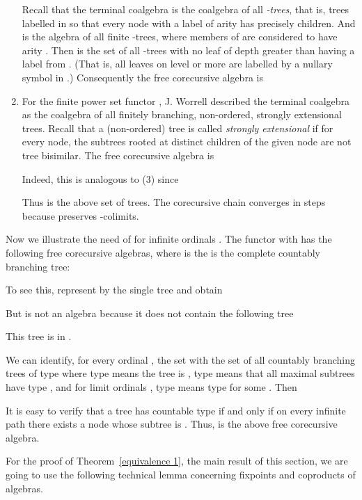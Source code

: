 \documentclass{LMCS}
\theoremstyle{plain}
\theoremstyle{definition}
\numberwithin{equation}{section}
\begin{document}
\begin{defi}
\begin{exa}
\begin{enumerate}
Recall that the terminal coalgebra is the coalgebra of all {\it -trees}, that is, trees labelled in  so that every node with a label of arity  has precisely  children. And  is the algebra of all finite -trees, where members of  are considered to have arity . Then  is the set of all -trees with no leaf of depth greater than  having a label from . (That is, all leaves on level  or more are labelled by a nullary symbol in .) Consequently the free corecursive algebra  is


\item For the finite power set functor , J. Worrell
\cite{w} described the terminal coalgebra  as the coalgebra of all finitely branching,
non-ordered, strongly extensional  trees. Recall that a (non-ordered)
tree is called {\it strongly extensional} if for every node, the subtrees rooted at distinct children of the given node are not tree bisimilar. The free corecursive algebra is

Indeed, this is analogous to (3) since

Thus  is the above set of trees. The
corecursive chain converges in  steps  because 
preserves -colimits.
\end{enumerate}
\end{exa}
\begin{exa}
Now we illustrate the need of  for infinite ordinals . The
functor  with
 has the following free corecursive algebras, where
 is the is the complete countably branching tree:

To see this, represent  by the single tree  and obtain

 But  is not an algebra because it does not contain the following tree
 
 This tree is in .

 We can identify, for every ordinal , the set  with the set of all countably branching trees of type  where type  means the tree is , type  means that all maximal subtrees have type , and for limit ordinals , type  means type  for some . Then
 
 It is easy to verify that a tree has countable type if and only if on every infinite path there exists a node whose subtree is . Thus,  is the above free corecursive algebra.
 \end{exa}

For the proof of Theorem~\ref{equivalence 1}, the main result of this section, we are going to use the following technical lemma concerning fixpoints and coproducts of algebras.


\end{defi}
\end{document}

